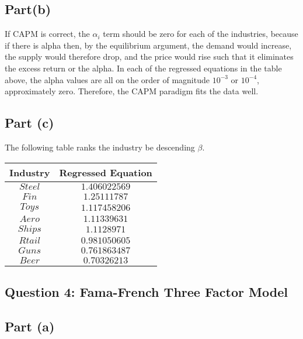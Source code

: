 \documentclass[12pt]{article}
\begin{document}
	\subsection{Part(b)}
	
		If CAPM is correct, the $\alpha_{i}$ term should be zero for each of the industries, because if there is alpha then, by the equilibrium argument, the 
		demand would increase, the supply would therefore drop, and the price would rise such that it eliminates the excess return or the alpha. In each of the 
		regressed equations in the table above, the alpha values are all on the order of magnitude $10^{-3}$ or $10^{-4}$, approximately zero. Therefore, 
		the CAPM paradigm fits the data well. 
		\newpage
	\subsection{Part (c)}
	
		The following table ranks the industry be descending $\beta$. 
		\begin{center}
 		\begin{tabular}{||c c||} 
 		\hline
 		 Industry &  Regressed Equation \\ [0.5ex] 
 		\hline \hline
 		$Steel$ & $1.406022569$  \\ 
 		\hline
 		$Fin$ & $1.25111787$ \\
 		\hline
 		$Toys$ & $1.117458206$  \\
 		\hline
 		$Aero$ & $1.11339631$  \\
 		\hline
 		$Ships$ & $1.1128971$  \\
 		\hline
 		$Rtail$ & $0.981050605$ \\
 		\hline
 		$Guns$ & $0.761863487$ \\
 		\hline
 		$Beer$ & $0.70326213$ \\ 
 		\hline
		\end{tabular}
		\end{center}
		 
		
\subsection{Question 4: Fama-French Three Factor Model}


	\subsection{Part (a)}
	
\end{document}
